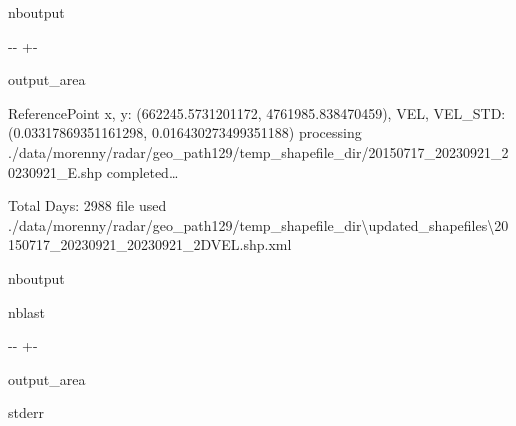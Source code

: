 \documentclass[letterpaper,10pt,english]{sphinxmanual}
\begin{document}
\begin{sphinxuseclass}{nboutput}
{

\kern-\sphinxverbatimsmallskipamount\kern-\baselineskip
\kern+\FrameHeightAdjust\kern-\fboxrule
\vspace{\nbsphinxcodecellspacing}

\begin{sphinxuseclass}{output_area}
\begin{sphinxuseclass}{}


\begin{sphinxVerbatim}[commandchars=\\\{\}]
ReferencePoint x, y: (662245.5731201172, 4761985.838470459), VEL, VEL\_STD: (0.03317869351161298, 0.016430273499351188)
processing ./data/morenny/radar/geo\_path129/temp\_shapefile\_dir/20150717\_20230921\_20230921\_E.shp completed{\ldots}

Total Days: 2988
file used ./data/morenny/radar/geo\_path129/temp\_shapefile\_dir\textbackslash{}updated\_shapefiles\textbackslash{}20150717\_20230921\_20230921\_2DVEL.shp.xml
\end{sphinxVerbatim}



\end{sphinxuseclass}
\end{sphinxuseclass}
}

\end{sphinxuseclass}
\begin{sphinxuseclass}{nboutput}
\begin{sphinxuseclass}{nblast}
{

\kern-\sphinxverbatimsmallskipamount\kern-\baselineskip
\kern+\FrameHeightAdjust\kern-\fboxrule
\vspace{\nbsphinxcodecellspacing}

\begin{sphinxuseclass}{output_area}
\begin{sphinxuseclass}{stderr}


\begin{sphinxVerbatim}[commandchars=\\\{\}]

\end{sphinxVerbatim}

\end{sphinxuseclass}
\end{sphinxuseclass}
}

\end{sphinxuseclass}
\end{sphinxuseclass}
\end{document}
